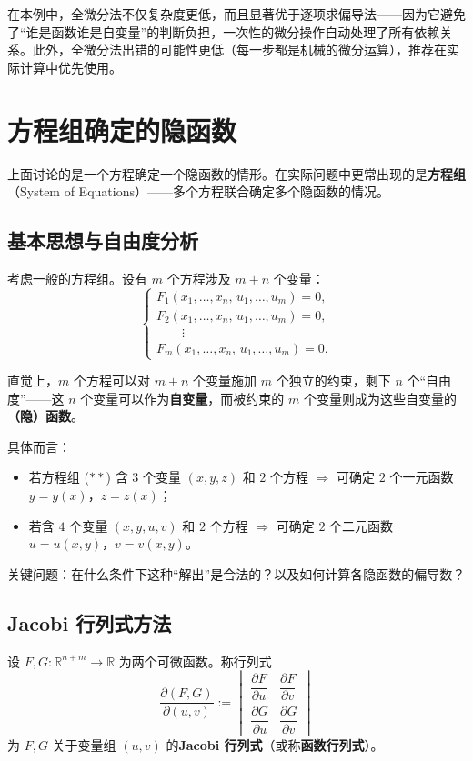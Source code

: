 \documentclass[lang=cn,11pt]{elegantbook}
\begin{document}
\begin{remark}[两种方法的比较]
在本例中，全微分法不仅复杂度更低，而且显著优于逐项求偏导法——因为它避免了“谁是函数谁是自变量”的判断负担，一次性的微分操作自动处理了所有依赖关系。此外，全微分法出错的可能性更低（每一步都是机械的微分运算），推荐在实际计算中优先使用。
\end{remark}


\section{方程组确定的隐函数} \label{def:implicit-system}

上面讨论的是一个方程确定一个隐函数的情形。在实际问题中更常出现的是\textbf{方程组}（System of Equations）——多个方程联合确定多个隐函数的情况。

\subsection{基本思想与自由度分析}

考虑一般的方程组。设有 $m$ 个方程涉及 $m+n$ 个变量：
\[
\begin{cases}
F_1(x_1,\dots,x_n,\,u_1,\dots,u_m)=0,\\
F_2(x_1,\dots,x_n,\,u_1,\dots,u_m)=0,\\
\qquad\vdots\\
F_m(x_1,\dots,x_n,\,u_1,\dots,u_m)=0.
\end{cases}
\tag{$\ast\ast$}
\]

直觉上，$m$ 个方程可以对 $m+n$ 个变量施加 $m$ 个独立的约束，剩下 $n$ 个“自由度”——这 $n$ 个变量可以作为\textbf{自变量}，而被约束的 $m$ 个变量则成为这些自变量的\textbf{（隐）函数}。

具体而言：
\begin{itemize}
  \item 若方程组 ($\ast\ast$) 含 $3$ 个变量 $(x,y,z)$ 和 $2$ 个方程 $\Rightarrow$ 可确定 $2$ 个一元函数 $y=y(x)$，$z=z(x)$；
  \item 若含 $4$ 个变量 $(x,y,u,v)$ 和 $2$ 个方程 $\Rightarrow$ 可确定 $2$ 个二元函数 $u=u(x,y)$，$v=v(x,y)$。
\end{itemize}

关键问题：在什么条件下这种“解出”是合法的？以及如何计算各隐函数的偏导数？

\subsection{Jacobi 行列式方法}

\begin{definition} \label{def:jacobi-det}
设 $F,G:\mathbb R^{n+m}\to\mathbb R$ 为两个可微函数。称行列式
\[
\frac{\partial(F,G)}{\partial(u,v)}
:=\begin{vmatrix}
\dfrac{\partial F}{\partial u} & \dfrac{\partial F}{\partial v}\\[8pt]
\dfrac{\partial G}{\partial u} & \dfrac{\partial G}{\partial v}
\end{vmatrix}
\]
为 $F,G$ 关于变量组 $(u,v)$ 的\textbf{Jacobi 行列式}（或称\textbf{函数行列式}）。
\end{definition}
\end{document}
